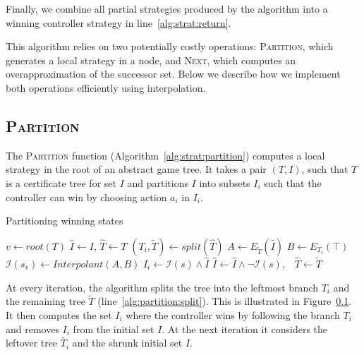 Finally, we combine all partial strategies produced by the
algorithm into a winning controller strategy in
line~\ref{alg:strat:return}.

This algorithm relies on two potentially costly operations:
\textsc{Partition}, which generates a local strategy in a node,
and \textsc{Next}, which computes an overapproximation of the
successor set.  Below we describe how we implement both operations
efficiently using interpolation.

\subsection{\textsc{Partition}}
The \textsc{Partition} function
(Algorithm~\ref{alg:strat:partition}) computes a local strategy in
the root of an abstract game tree.  It takes a pair $(T,I)$, such
that $T$ is a certificate tree for set $I$ and partitions $I$ into
subsets $I_i$ such that the controller can win by choosing action
$a_i$ in $I_i$.

\begin{algorithm}[t]
   \caption{Partitioning winning states}\label{alg:strat:partition}
   \begin{algorithmic}[1]
        \State $v \gets root(T)$
            \State $\hat{I} \gets I$, $\hat{T} \gets T$ 
            \State $(T_i, \tilde{T}) \gets split(\hat{T})$\label{alg:partition:split}
            \State $A \gets E_{\tilde{T}}(\hat{I}) $ \label{alg:strat:partition:Bi}
            \State $B \gets E_{T_i}(\top)$\label{alg:strat:partition:Ai}
            \State $\mathcal{I}(s_v) \gets Interpolant(A, B)$\label{alg:partition:I}
            \State $I_i \gets \mathcal{I}(s) \land \hat{I}$\label{alg:partition:Ii}
            \State $\hat{I} \gets \hat{I} \land \neg\mathcal{I}(s)$,~~$\hat{T} \gets \tilde{T}$\label{alg:partition:upd}
            \EndFor
            \State \Return{$[(T_1, I_1),\ldots, (T_j, I_j)]$} \label{alg:strat:partition:return}
        \EndFunction
    \end{algorithmic}
\end{algorithm}

At every iteration, the algorithm splits the tree into the
leftmost branch $T_i$ and the remaining tree $\tilde{T}$
(line~\ref{alg:partition:split}).  This is illustrated in
Figure~\ref{}.  It then computes the set $I_i$ where the
controller wins by following the branch $T_i$ and removes $I_i$
from the initial set $I$.  At the next iteration it considers the
leftover tree $\tilde{T_i}$ and the shrunk initial set $\hat{I}$.

